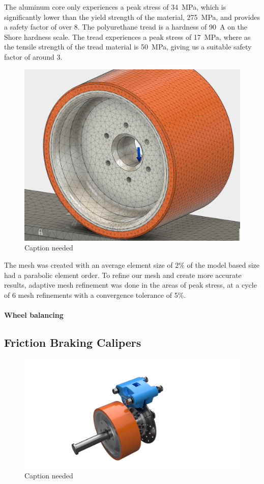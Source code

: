 \documentclass[main.tex]{subfiles}
\begin{document}
    The aluminum core only experiences a peak stress of \SI{34}{MPa}, which is significantly lower than the yield strength of the material, \SI{275}{MPa}, and provides a safety factor of over 8. The polyurethane tread is a hardness of \SI{90}{A} on the Shore hardness scale. The tread experiences a peak stress of \SI{17}{MPa}, where as the tensile strength of the tread material is \SI{50}{MPa}, giving us a suitable safety factor of around 3.
    \begin{figure}[H]
        \centering
        \includegraphics[width=\linewidth]{images/fig22}
        \caption{Caption needed}
    \end{figure}
    The mesh was created with an average element size of 2\% of the model based size had a parabolic element order. To refine our mesh and create more accurate results, adaptive mesh refinement was done in the areas of peak stress, at a cycle of 6 mesh refinements with a convergence tolerance of 5\%.

    \paragraph{Wheel balancing}
    \subsection{Friction Braking Calipers}
    \begin{figure}[H]
        \centering
        \includegraphics[width=\linewidth]{images/fig23}
        \caption{Caption needed}
    \end{figure}
\end{document}
